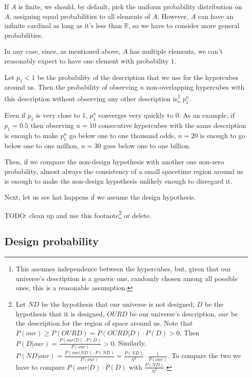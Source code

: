 \documentclass[a4paper
,draft
]{article}
\def\reale{\mathbb{R}}
\def\our_description{OURD}
\begin{document}
If $A$ is finite, we should, by default, pick the uniform probability
distribution on $A$, assigning equal probabilities to all elements of $A$.
However, $A$ can have an infinite cardinal as long as it's less than $\reale$,
so we have to consider more general probabilities.

In any case, since, as mentioned above, $A$ has multiple elements,
we can't reasonably expect to have one element with probability $1$.

Let $p_1<1$ be the probability of the description that we use for the
hypercubes around us.
Then the probability of observing $n$
non-overlapping hypercubes
with this description without observing any other description is\footnote{
  This assumes independence between the hypercubes, but, given that our
  universe's description is a generic one, randomly chosen among all possible
  ones, this is a reasonable assumption.
}
$p_1^n$.

Even if $p_1$ is very close to $1$, $p_1^n$ converges very quickly to 0.
As an example, if $p_1=0.5$ then observing $n=10$ consecutive hypercubes with
the same description is enough to make $p_1^n$ go below one to one thousand
odds, $n=20$ is enough to go below one to one million,
$n=30$ goes below one to one billion.

Then, if we compare the non-design hypothesis
with another one non-zero probability,
almost always the consistency of a small spacetime region around us is enough
to make the non-design hypothesis unlikely enough to disregard it.

Next, let us see hat happens if we assume the design hypothesis.

TODO: clean up and use this footnote\footnote{
  Let $ND$ be the hypothesis that our universe is not designed,
  $D$ be the hypothesis that it is designed, $\our_description$ be our
  universe's description,
  $our$ be the description for the region of space around us.
  Note that
  $P(our) \ge P(\our_description)=P(\our_description|D)\cdot P(D) > 0$.
  Then $P(D|our) = \frac{P(our|D)\cdot P(D)}{P(our)} > 0$.
  Similarly,
  $P(ND|our) = \frac{P(our|ND)\cdot P(ND)}{P(our)}
    = \frac{P(ND)}{N^k} \cdot \frac{1}{P(our)}$.
  To compare the two we have to compare
  $P(our|D)\cdot P(D)$ with $\frac{P(ND)}{N^k}$.
  } or delete.

\subsection{Design probability}
\label{sec:design-probability}
\end{document}
